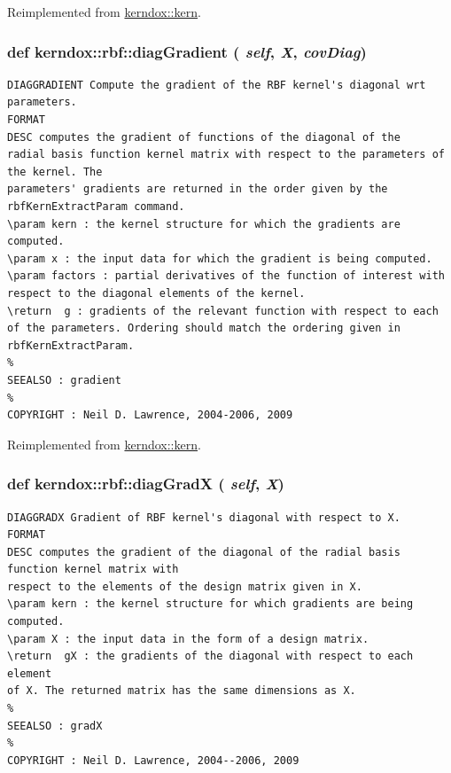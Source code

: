 Reimplemented from \hyperlink{classkerndox_1_1kern}{kerndox::kern}.\hypertarget{classkerndox_1_1rbf_8b5c3e33cf0ccc24afe05d49136d428a}{
\subsubsection[{diagGradient}]{\setlength{\rightskip}{0pt plus 5cm}def kerndox::rbf::diagGradient ( {\em self}, \/   {\em X}, \/   {\em covDiag})}}
\label{classkerndox_1_1rbf_8b5c3e33cf0ccc24afe05d49136d428a}




\footnotesize\begin{verbatim}DIAGGRADIENT Compute the gradient of the RBF kernel's diagonal wrt parameters.
FORMAT
DESC computes the gradient of functions of the diagonal of the
radial basis function kernel matrix with respect to the parameters of the kernel. The
parameters' gradients are returned in the order given by the
rbfKernExtractParam command.
\param kern : the kernel structure for which the gradients are
computed.
\param x : the input data for which the gradient is being computed.
\param factors : partial derivatives of the function of interest with
respect to the diagonal elements of the kernel.
\return  g : gradients of the relevant function with respect to each
of the parameters. Ordering should match the ordering given in
rbfKernExtractParam.
%
SEEALSO : gradient
%
COPYRIGHT : Neil D. Lawrence, 2004-2006, 2009

\end{verbatim}
\normalsize
 

Reimplemented from \hyperlink{classkerndox_1_1kern}{kerndox::kern}.\hypertarget{classkerndox_1_1rbf_ecdf6a3ae961ea26d9cc102767d93795}{
\subsubsection[{diagGradX}]{\setlength{\rightskip}{0pt plus 5cm}def kerndox::rbf::diagGradX ( {\em self}, \/   {\em X})}}
\label{classkerndox_1_1rbf_ecdf6a3ae961ea26d9cc102767d93795}




\footnotesize\begin{verbatim}DIAGGRADX Gradient of RBF kernel's diagonal with respect to X.
FORMAT
DESC computes the gradient of the diagonal of the radial basis function kernel matrix with
respect to the elements of the design matrix given in X.
\param kern : the kernel structure for which gradients are being computed.
\param X : the input data in the form of a design matrix.
\return  gX : the gradients of the diagonal with respect to each element
of X. The returned matrix has the same dimensions as X.
%
SEEALSO : gradX
%
COPYRIGHT : Neil D. Lawrence, 2004--2006, 2009

\end{verbatim}
\normalsize
 

